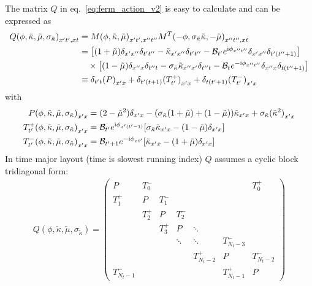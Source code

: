 \documentclass[a4paper, fleqn, twoside, notitlepage]{scrartcl}
\begin{document}
\noindent
The matrix $Q$ in eq.~\eqref{eq:ferm_action_v2} is easy to calculate and can be expressed as
\begin{align}
  {Q(\phi, \tilde{\kappa}, \tilde{\mu}, \sigma_{\tilde{\kappa}})}_{x't',xt}
  &= {M(\phi, \tilde{\kappa}, \tilde{\mu})}_{x't',x''t''} {M^T(-\phi, \sigma_{\tilde{\kappa}}\tilde{\kappa}, -\tilde{\mu})}_{x''t'',xt}\\
  &= \big[(1+\tilde{\mu})\delta_{x'x''}\delta_{t't''} - \tilde{\kappa}_{x'x''}\delta_{t't''} - \mathcal{B}_{t'}e^{\mathrm{i}\phi_{x''t''}}\delta_{x'x''}\delta_{t'(t''+1)}\big] \nonumber\\
  &\quad\times \big[(1-\tilde{\mu})\delta_{x'' x}\delta_{t'' t} - \sigma_{\tilde{\kappa}}\tilde{\kappa}_{x'' x'}\delta_{t'' t} - \mathcal{B}_{t}e^{-\mathrm{i}\phi_{x''t''}}\delta_{x'' x}\delta_{t(t''+1)}\big]\\
  &\equiv \delta_{t't}{(P)}_{x'x} + \delta_{t'(t+1)}{(T^+_{t'})}_{x'x} + \delta_{t(t'+1)}{(T^-_{t'})}_{x'x}
\end{align}
with
\begin{align}
  {P(\phi, \tilde{\kappa}, \tilde{\mu}, \sigma_{\tilde{\kappa}})}_{x'x} &= (2-\tilde{\mu}^2)\delta_{x'x} - (\sigma_{\tilde{\kappa}}(1+\tilde{\mu}) + (1-\tilde{\mu}))\tilde{\kappa}_{x'x} + \sigma_{\tilde{\kappa}}{(\tilde{\kappa}^2)}_{x'x}\\
  {T^+_{t'}(\phi, \tilde{\kappa}, \tilde{\mu}, \sigma_{\tilde{\kappa}})}_{x'x} &= \mathcal{B}_{t'}e^{\mathrm{i}\phi_{x'(t'-1)}}[\sigma_{\tilde{\kappa}}\tilde{\kappa}_{x'x} - (1-\tilde{\mu})\delta_{x'x}]\\
  {T^-_{t'}(\phi, \tilde{\kappa}, \tilde{\mu}, \sigma_{\tilde{\kappa}})}_{x'x} &= \mathcal{B}_{t'+1}e^{-\mathrm{i}\phi_{xt'}}[\tilde{\kappa}_{x'x} - (1+\tilde{\mu})\delta_{x'x}]
\end{align}
In time major layout (time is slowest running index) $Q$ assumes a cyclic block tridiagonal form:
\begin{align}
  Q(\phi, \tilde{\kappa}, \tilde{\mu}, \sigma_{\tilde{\kappa}}) =
  \begin{pmatrix}
    P         & T^-_0 &       &         &           &              & T^+_0    \\
    T^+_1     & P     & T^-_1 &         &           &              &          \\
              & T^+_2 & P     & T^-_2   &           &              &          \\
              &       & T^+_3 & P      & \ddots         &              &          \\
              &       &       & \ddots     & \ddots         & T^-_{N_t-3}    &          \\
              &       &       &        & T^+_{N_t-2} & P            & T^-_{N_t-2}\\
    T^-_{N_t-1} &       &       &        &           & T^+_{N_t-1}    & P
  \end{pmatrix}
\end{align}
\end{document}
